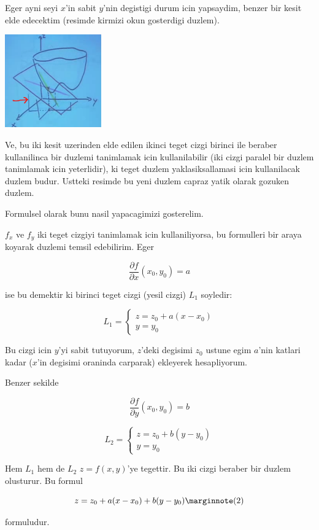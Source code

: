 \documentclass[12pt,fleqn]{article}\usepackage{../common}
\begin{document}
Eger ayni seyi $x$'in sabit $y$'nin degistigi durum icin yapsaydim,
benzer bir kesit elde edecektim (resimde kirmizi okun gosterdigi duzlem). 

\includegraphics[height=4cm]{9_2.png}

Ve, bu iki kesit uzerinden elde edilen ikinci teget cizgi birinci ile beraber
kullanilinca bir duzlemi tanimlamak icin kullanilabilir (iki cizgi paralel
bir duzlem tanimlamak icin yeterlidir), ki teget duzlem yaklasiksallamasi
icin kullanilacak duzlem budur. Ustteki resimde bu yeni duzlem capraz yatik
olarak gozuken duzlem. 

Formulsel olarak bunu nasil yapacagimizi gosterelim.

$f_x$ ve $f_y$ iki teget cizgiyi tanimlamak icin kullaniliyorsa, bu
formulleri bir araya koyarak duzlemi temsil edebilirim. Eger

\[ \frac{\partial f}{\partial x}(x_0,y_0) = a \]

ise bu demektir ki birinci teget cizgi (yesil cizgi) $L_1$ soyledir:

\[ 
L_1 = 
\left\{ \begin{array}{l}
z = z_0 + a(x - x_0) \\
y = y_0
\end{array} \right.
 \]

Bu cizgi icin $y$'yi sabit tutuyorum, $z$'deki degisimi $z_0$ ustune egim
$a$'nin katlari kadar ($x$'in degisimi oraninda carparak) ekleyerek
hesapliyorum. 

Benzer sekilde

\[ \frac{\partial f}{\partial y}(x_0,y_0) = b \]

\[ 
L_2 = 
\left\{ \begin{array}{l}
z = z_0 + b(y - y_0) \\
y = y_0
\end{array} \right.
 \]

Hem $L_1$ hem de $L_2$ $z = f(x,y)$'ye tegettir. Bu iki cizgi beraber bir
duzlem olusturur. Bu formul

\[
z = z_0 + a(x-x_0) + b(y-y_0) 
\mlabel{2}
\]

formuludur. 
\end{document}
